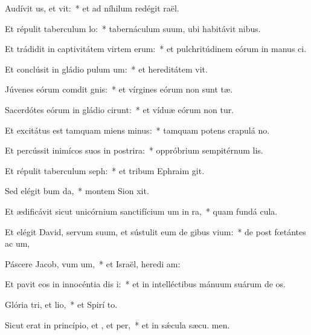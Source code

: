 \item Audívit us, et vit:~* et ad níhilum redégit  raël.
\item Et répulit taberculum lo:~* tabernáculum suum, ubi habitávit  nibus.
\item Et trádidit in captivitátem virtem erum:~* et pulchritúdinem eórum in manus ci.
\item Et conclúsit in gládio pulum um:~* et hereditátem  vit.
\item Júvenes eórum comdit gnis:~* et vírgines eórum non sunt tæ.
\item Sacerdótes eórum in gládio cirunt:~* et víduæ eórum non tur.
\item Et excitátus est tamquam miens minus:~* tamquam potens crapulá  no.
\item Et percússit inimícos suos in postrira:~* oppróbrium sempitérnum  lis.
\item Et répulit taberculum seph:~* et tribum Ephraim  git.
\item Sed elégit bum da,~* montem Sion  xit.
\item Et ædificávit sicut unicórnium sanctifícium um in ra,~* quam fundá  cula.
\item Et elégit David, servum suum, et sústulit eum de gibus vium:~* de post fœtántes ac um,
\item Páscere Jacob, vum um,~* et Israël, heredi am:
\item Et pavit eos in innocéntia dis i:~* et in intelléctibus mánuum suárum de os.
\item Glória tri, et lio,~* et Spirí to.
\item Sicut erat in princípio, et , et per,~* et in sǽcula sæcu. men.
